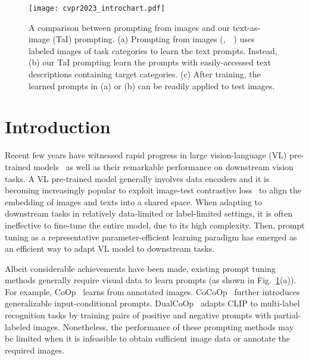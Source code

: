 \documentclass[10pt,twocolumn,letterpaper]{article}
\begin{document}
\begin{figure}
  \centering
\texttt{[image: cvpr2023\_introchart.pdf]}
  \vspace{-2mm}
  \caption{A comparison between prompting from images and our text-as-image (TaI) prompting. (a) Prompting from images (\eg,~~\cite{coop}) uses labeled images of task categories to learn the text prompts. Instead, (b) our TaI prompting learn the prompts with easily-accessed text descriptions containing target categories. (c) After training, the learned prompts in (a) or (b) can be readily applied to test images.}
  \label{fig:intro}
\end{figure}

\section{Introduction}
\label{sec:introduction}
Recent few years have witnessed rapid progress in large vision-language (VL) pre-trained models~\cite{clip,align,declip,filip,alayrac2022flamingo,yuan2021florence} as well as their remarkable performance on downstream vision tasks.
A VL pre-trained model generally involves data encoders and it is becoming increasingly popular to exploit image-test contrastive loss~\cite{clip} to align the embedding of images and texts into a shared space.  
When adapting to downstream tasks in relatively data-limited or label-limited settings, it is often ineffective to fine-tune the entire model, due to its high complexity.
Then, prompt tuning as a representative parameter-efficient learning paradigm has emerged as an efficient way to adapt VL model to downstream tasks.






Albeit considerable achievements have been made, existing prompt tuning methods generally require visual data to learn prompts (as shown in Fig.~\ref{fig:intro}(a)). 
For example, CoOp~\cite{coop} learns from annotated images.
CoCoOp~\cite{cocoop} further introduces generalizable input-conditional prompts.
DualCoOp~\cite{dualcoop} adapts CLIP to multi-label recognition tasks by training pairs of positive and negative prompts with partial-labeled images.
Nonetheless, the performance of these prompting methods may be limited when it is infeasible to obtain sufficient image data or annotate the required images.
\end{document}
